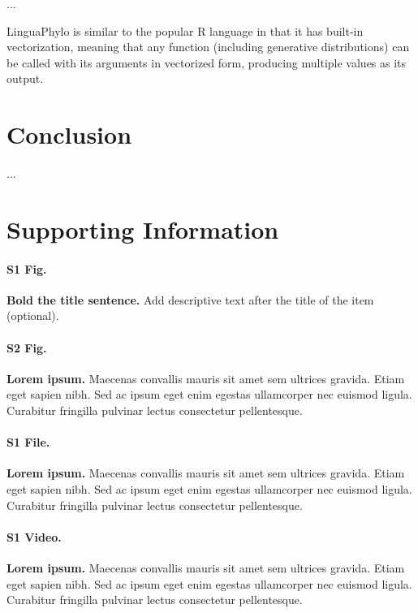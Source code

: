 \documentclass[10pt,letterpaper,table]{article}
\begin{document}
{...

LinguaPhylo is similar to the popular R language \cite{R} in that it
has built-in vectorization, meaning that any function (including
generative distributions) can be called with its arguments in
vectorized form, producing multiple values as its output. 


\section*{Conclusion}
...

\section*{Supporting Information}

\paragraph*{S1 Fig.}
\label{S1_Fig}
{\bf Bold the title sentence.} Add descriptive text after the title of the item (optional).

\paragraph*{S2 Fig.}
\label{S2_Fig}
{\bf Lorem ipsum.} Maecenas convallis mauris sit amet sem ultrices gravida. Etiam eget sapien nibh. Sed ac ipsum eget enim egestas ullamcorper nec euismod ligula. Curabitur fringilla pulvinar lectus consectetur pellentesque.

\paragraph*{S1 File.}
\label{S1_File}
{\bf Lorem ipsum.}  Maecenas convallis mauris sit amet sem ultrices gravida. Etiam eget sapien nibh. Sed ac ipsum eget enim egestas ullamcorper nec euismod ligula. Curabitur fringilla pulvinar lectus consectetur pellentesque.

\paragraph*{S1 Video.}
\label{S1_Video}
{\bf Lorem ipsum.}  Maecenas convallis mauris sit amet sem ultrices gravida. Etiam eget sapien nibh. Sed ac ipsum eget enim egestas ullamcorper nec euismod ligula. Curabitur fringilla pulvinar lectus consectetur pellentesque.

}
\end{document}
